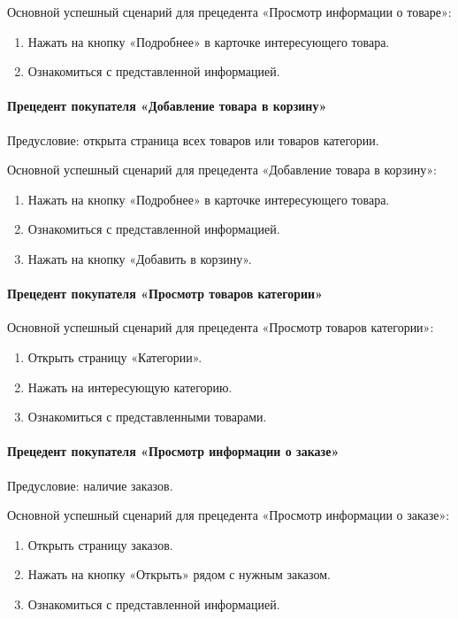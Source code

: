 Основной успешный сценарий для прецедента «Просмотр информации о товаре»:
\begin{enumerate}
	\item Нажать на кнопку «Подробнее» в карточке интересующего товара.
	\item Ознакомиться с представленной информацией.
\end{enumerate}

\paragraph{Прецедент покупателя «Добавление товара в корзину»}
Предусловие: открыта страница всех товаров или товаров категории.

Основной успешный сценарий для прецедента «Добавление товара в корзину»:
\begin{enumerate}
	\item Нажать на кнопку «Подробнее» в карточке интересующего товара.
	\item Ознакомиться с представленной информацией.
	\item Нажать на кнопку «Добавить в корзину».
\end{enumerate}

\paragraph{Прецедент покупателя «Просмотр товаров категории»}

Основной успешный сценарий для прецедента «Просмотр товаров категории»:
\begin{enumerate}
	\item Открыть страницу «Категории».
	\item Нажать на интересующую категорию.
	\item Ознакомиться с представленными товарами.
\end{enumerate}

\paragraph{Прецедент покупателя «Просмотр информации о заказе»}
Предусловие: наличие заказов.

Основной успешный сценарий для прецедента «Просмотр информации о заказе»:
\begin{enumerate}
	\item Открыть страницу заказов.
	\item Нажать на кнопку «Открыть» рядом с нужным заказом.
	\item Ознакомиться с представленной информацией.
\end{enumerate}

